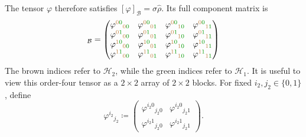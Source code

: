 \documentclass[
    aps,
    pra,
    reprint,
    superscriptaddress,
    nofootinbib
]{revtex4-2}
\theoremstyle{definition}
\theoremstyle{plain}
\begin{document}
The tensor $\varphi$ therefore satisfies
$[\varphi]_{\mathcal{B}}=\sigma\hat{\rho}$. Its full component matrix
is
\begin{equation}
    [\varphi]_{\mathcal{B}}=\begin{pmatrix}
        \varphi^{\color{brown}0\color{green!60!black}0}{}_{\color{brown}0\color{green!60!black}0} & \varphi^{\color{brown}0\color{green!60!black}0}{}_{\color{brown}0\color{green!60!black}1} & \varphi^{\color{brown}0\color{green!60!black}0}{}_{\color{brown}1\color{green!60!black}0} & \varphi^{\color{brown}0\color{green!60!black}0}{}_{\color{brown}1\color{green!60!black}1} \\ 
        \varphi^{\color{brown}0\color{green!60!black}1}{}_{\color{brown}0\color{green!60!black}0} & \varphi^{\color{brown}0\color{green!60!black}1}{}_{\color{brown}0\color{green!60!black}1} & \varphi^{\color{brown}0\color{green!60!black}1}{}_{\color{brown}1\color{green!60!black}0} & \varphi^{\color{brown}0\color{green!60!black}1}{}_{\color{brown}1\color{green!60!black}1} \\ 
        \varphi^{\color{brown}1\color{green!60!black}0}{}_{\color{brown}0\color{green!60!black}0} & \varphi^{\color{brown}1\color{green!60!black}0}{}_{\color{brown}0\color{green!60!black}1} & \varphi^{\color{brown}1\color{green!60!black}0}{}_{\color{brown}1\color{green!60!black}0} & \varphi^{\color{brown}1\color{green!60!black}0}{}_{\color{brown}1\color{green!60!black}1}\\
        \varphi^{\color{brown}1\color{green!60!black}1}{}_{\color{brown}0\color{green!60!black}0} & \varphi^{\color{brown}1\color{green!60!black}1}{}_{\color{brown}0\color{green!60!black}1} & \varphi^{\color{brown}1\color{green!60!black}1}{}_{\color{brown}1\color{green!60!black}0} & \varphi^{\color{brown}1\color{green!60!black}1}{}_{\color{brown}1\color{green!60!black}1}  
\end{pmatrix}
\end{equation}
The brown indices refer to $\mathcal{H}_{2}$, while the green indices
refer to $\mathcal{H}_{1}$. It is useful to view this order-four tensor
as a $2\times2$ array of $2\times2$ blocks. For fixed
$i_{2},j_{2}\in\{0,1\}$, define
\begin{equation}
    \varphi^{i_{2}}{}_{j_{2}}
    \coloneqq
    \begin{pmatrix}
        \varphi^{i_{2}0}{}_{j_{2}0}&
        \varphi^{i_{2}0}{}_{j_{2}1}\\
        \varphi^{i_{2}1}{}_{j_{2}0}&
        \varphi^{i_{2}1}{}_{j_{2}1}
    \end{pmatrix}.
\end{equation}
\end{document}

